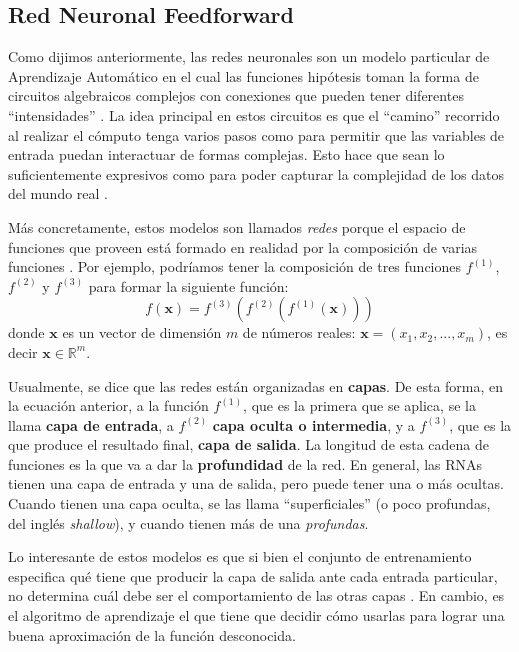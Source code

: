 \documentclass[../../main.tex]{subfiles}
\begin{document}
\subsection{Red Neuronal Feedforward}
Como dijimos anteriormente, las redes neuronales son un modelo particular de Aprendizaje
Automático en el cual las funciones hipótesis toman la forma de circuitos algebraicos
complejos con conexiones que pueden tener diferentes ``intensidades''
\cite{ai-a-modern-approach}. La idea principal en estos circuitos es que el ``camino''
recorrido al realizar el cómputo tenga varios pasos como para permitir que las variables
de entrada puedan interactuar de formas complejas. Esto hace que sean lo suficientemente
expresivos como para poder capturar la complejidad de los datos del mundo real
\cite{ai-a-modern-approach}.

Más concretamente, estos modelos son llamados \textit{redes} porque el espacio de
funciones que proveen está formado en realidad por la composición de varias funciones
\cite{deep-learning}. Por ejemplo, podríamos tener la composición de tres funciones
\(f^{(1)}\), \(f^{(2)}\) y \(f^{(3)}\) para formar la siguiente función:
\begin{equation}
    f(\mathbf{x}) = f^{(3)}(f^{(2)}(f^{(1)}(\mathbf{x})))
    \label{eq:fun-composition}
\end{equation}
donde \(\mathbf{x}\) es un vector de dimensión \(m\) de números reales: \(\mathbf{x}=(x_1,
x_2, ..., x_m)\), es decir \(\mathbf{x} \in \mathbb{R}^m\).

Usualmente, se dice que las redes están organizadas en \textbf{capas}. De esta forma, en
la ecuación anterior, a la función \(f^{(1)}\), que es la primera que se aplica, se la
llama \textbf{capa de entrada}, a \(f^{(2)}\) \textbf{capa oculta o intermedia}, y a
\(f^{(3)}\), que es la que produce el resultado final, \textbf{capa de salida}. La
longitud de esta cadena de funciones es la que va a dar la \textbf{profundidad} de la red.
En general, las RNAs tienen una capa de entrada y una de salida, pero puede tener una o
más ocultas. Cuando tienen una capa oculta, se las llama ``superficiales'' (o poco
profundas, del inglés \textit{shallow}), y cuando tienen más de una \textit{profundas}.

Lo interesante de estos modelos es que si bien el conjunto de entrenamiento especifica qué
tiene que producir la capa de salida ante cada entrada particular, no determina cuál debe
ser el comportamiento de las otras capas \cite{deep-learning}. En cambio, es el algoritmo
de aprendizaje el que tiene que decidir cómo usarlas para lograr una buena aproximación de
la función desconocida.
\end{document}
